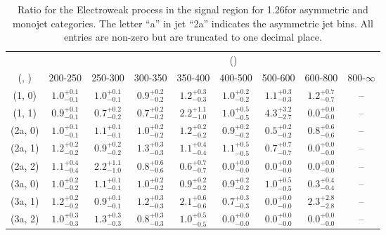 \begin{table}[h!]
\tiny
\centering
\caption{Ratio for the Electroweak process in the signal region for 1.26\ifb for asymmetric and monojet categories. The letter ``a'' in jet \eg ``2a''  indicates the asymmetric jet bins. All entries are non-zero but are truncated to one decimal place.\label{tab:ratiosep_sig_ewk_asym}}
\begin{tabular}
{ccccccccc}
	\hline\hline
&	& \multicolumn{8}{c}{\scalht (\gev)} \\ 
	 (\njet,  \nb) & 200-250 & 250-300 & 300-350 & 350-400 & 400-500 & 500-600 & 600-800 & 800-$\infty$ \\ [0.8ex] 
\hline
	(1, 0) & $1.0^{+ 0.1 }_{- 0.1 }$ & $1.0^{+ 0.1 }_{- 0.1 }$ & $0.9^{+ 0.2 }_{- 0.2 }$ & $1.2^{+ 0.3 }_{- 0.3 }$ & $1.0^{+ 0.2 }_{- 0.2 }$ & $1.1^{+ 0.3 }_{- 0.3 }$ & $1.2^{+ 0.7 }_{- 0.7 }$ & -- \\[0.5ex] 
	(1, 1) & $0.9^{+ 0.1 }_{- 0.1 }$ & $0.7^{+ 0.2 }_{- 0.2 }$ & $0.7^{+ 0.2 }_{- 0.2 }$ & $2.2^{+ 1.1 }_{- 1.0 }$ & $1.0^{+ 0.5 }_{- 0.5 }$ & $4.3^{+ 3.2 }_{- 2.7 }$ & $0.0^{+ 0.0 }_{- 0.0 }$ & -- \\[0.5ex] 
	(2a, 0) & $1.0^{+ 0.1 }_{- 0.1 }$ & $1.1^{+ 0.1 }_{- 0.1 }$ & $1.0^{+ 0.2 }_{- 0.2 }$ & $1.2^{+ 0.2 }_{- 0.2 }$ & $0.9^{+ 0.2 }_{- 0.2 }$ & $0.5^{+ 0.2 }_{- 0.2 }$ & $0.8^{+ 0.6 }_{- 0.6 }$ & -- \\[0.5ex] 
	(2a, 1) & $1.2^{+ 0.2 }_{- 0.2 }$ & $0.9^{+ 0.2 }_{- 0.2 }$ & $1.3^{+ 0.3 }_{- 0.3 }$ & $1.1^{+ 0.4 }_{- 0.4 }$ & $1.1^{+ 0.5 }_{- 0.5 }$ & $0.7^{+ 0.7 }_{- 0.7 }$ & $0.0^{+ 0.0 }_{- 0.0 }$ & -- \\[0.5ex] 
	(2a, 2) & $1.1^{+ 0.4 }_{- 0.4 }$ & $2.2^{+ 1.1 }_{- 1.0 }$ & $0.8^{+ 0.6 }_{- 0.6 }$ & $0.6^{+ 0.7 }_{- 0.7 }$ & $0.0^{+ 0.0 }_{- 0.0 }$ & $0.0^{+ 0.0 }_{- 0.0 }$ & $0.0^{+ 0.0 }_{- 0.0 }$ & -- \\[0.5ex] 
	(3a, 0) & $1.0^{+ 0.2 }_{- 0.2 }$ & $1.1^{+ 0.1 }_{- 0.1 }$ & $1.0^{+ 0.2 }_{- 0.2 }$ & $0.9^{+ 0.2 }_{- 0.2 }$ & $0.9^{+ 0.2 }_{- 0.2 }$ & $1.0^{+ 0.5 }_{- 0.5 }$ & $0.3^{+ 0.4 }_{- 0.4 }$ & -- \\[0.5ex] 
	(3a, 1) & $1.2^{+ 0.2 }_{- 0.2 }$ & $0.9^{+ 0.1 }_{- 0.1 }$ & $1.2^{+ 0.3 }_{- 0.3 }$ & $2.1^{+ 0.6 }_{- 0.6 }$ & $0.7^{+ 0.3 }_{- 0.3 }$ & $0.0^{+ 0.0 }_{- 0.0 }$ & $2.3^{+ 2.8 }_{- 2.8 }$ & -- \\[0.5ex] 
	(3a, 2) & $1.0^{+ 0.3 }_{- 0.3 }$ & $1.3^{+ 0.3 }_{- 0.3 }$ & $0.8^{+ 0.3 }_{- 0.3 }$ & $1.0^{+ 0.5 }_{- 0.5 }$ & $0.0^{+ 0.0 }_{- 0.0 }$ & $0.0^{+ 0.0 }_{- 0.0 }$ & $0.0^{+ 0.0 }_{- 0.0 }$ & -- \\[0.5ex] 

\end{tabular}
\end{table}
